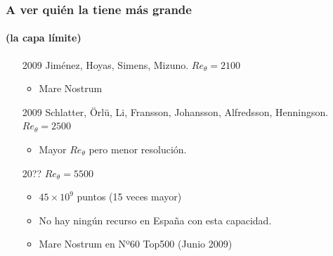 \documentclass{beamer}
\begin{document}
\begin{frame}
\frametitle{A ver quién la tiene más grande}
\framesubtitle{(la capa límite)}

\begin{itemize}
\item[2009] Jiménez, Hoyas, Simens, Mizuno. $Re_\theta = 2100$
  \begin{itemize}
  \item Mare Nostrum
  \end{itemize}
  \pause
\item[2009] Schlatter, Örlü, Li, Fransson, Johansson, Alfredsson,
  Henningson. $Re_\theta = 2500$
  \begin{itemize}
  \item Mayor $Re_\theta$ pero menor resolución.
  \end{itemize}
  \pause
\item[20??] $Re_\theta = 5500$
  \begin{itemize}
  \item $45 \times 10^9$ puntos (15 veces mayor)
  \item No hay ningún recurso en España con esta capacidad.
  \item Mare Nostrum en Nº60 Top500 (Junio 2009)
  \end{itemize}
\end{itemize}

\pause

\begin{center}
\end{center}

\end{frame}
\end{document}
